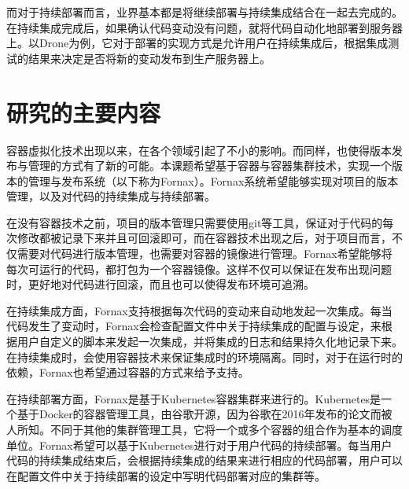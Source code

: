而对于持续部署而言，业界基本都是将继续部署与持续集成结合在一起去完成的。在持续集成完成后，如果确认代码变动没有问题，就将代码自动化地部署到服务器上。以Drone为例，它对于部署的实现方式是允许用户在持续集成后，根据集成测试的结果来决定是否将新的变动发布到生产服务器上。

\section{研究的主要内容}

容器虚拟化技术出现以来，在各个领域引起了不小的影响。而同样，也使得版本发布与管理的方式有了新的可能。本课题希望基于容器与容器集群技术，实现一个版本的管理与发布系统（以下称为Fornax）。Fornax系统希望能够实现对项目的版本管理，以及对代码的持续集成与持续部署。

在没有容器技术之前，项目的版本管理只需要使用git等工具，保证对于代码的每次修改都被记录下来并且可回滚即可，而在容器技术出现之后，对于项目而言，不仅需要对代码进行版本管理，也需要对容器的镜像进行管理。Fornax希望能够将每次可运行的代码，都打包为一个容器镜像。这样不仅可以保证在发布出现问题时，更好地对代码进行回滚，而且也可以使得发布环境可追溯。

在持续集成方面，Fornax支持根据每次代码的变动来自动地发起一次集成。每当代码发生了变动时，Fornax会检查配置文件中关于持续集成的配置与设定，来根据用户自定义的脚本来发起一次集成，并将集成的日志和结果持久化地记录下来。在持续集成时，会使用容器技术来保证集成时的环境隔离。同时，对于在运行时的依赖，Fornax也希望通过容器的方式来给予支持。

在持续部署方面，Fornax是基于Kubernetes容器集群来进行的。Kubernetes是一个基于Docker的容器管理工具，由谷歌开源，因为谷歌在2016年发布的论文\supercite{Borg}而被人所知。不同于其他的集群管理工具，它将一个或多个容器的组合作为基本的调度单位。Fornax希望可以基于Kubernetes进行对于用户代码的持续部署。每当用户代码的持续集成结束后，会根据持续集成的结果来进行相应的代码部署，用户可以在配置文件中关于持续部署的设定中写明代码部署对应的集群等。